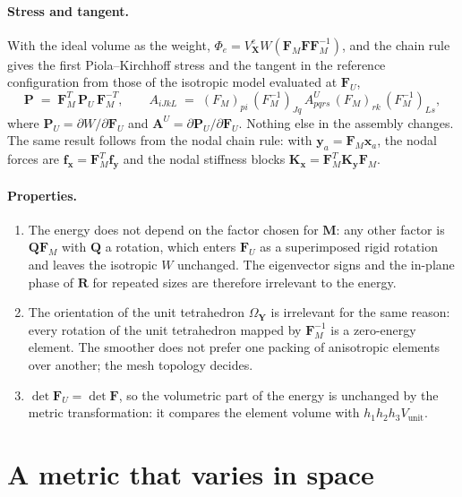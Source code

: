 \documentclass[11pt]{article}
\newcommand{\bs}[1]{\boldsymbol{#1}}
\begin{document}
\paragraph{Stress and tangent.} With the ideal volume as the weight,
$\Phi_e = V^e_{\bs X} W(\bs F_M \bs F \bs F_M^{-1})$, and the chain rule
gives the first Piola--Kirchhoff stress and the tangent in the reference
configuration from those of the isotropic model evaluated at $\bs F_U$,
\begin{equation}
  \bs P \;=\; \bs F_M^T\, \bs P_U\, \bs F_M^{-T},
  \qquad
  A_{iJkL} \;=\; (F_M)_{pi}\,(F_M^{-1})_{Jq}\, A^U_{pqrs}\,
  (F_M)_{rk}\,(F_M^{-1})_{Ls},
  \label{eq:pullback}
\end{equation}
where $\bs P_U = \partial W/\partial \bs F_U$ and
$\bs A^U = \partial \bs P_U / \partial \bs F_U$. Nothing else in the
assembly changes. The same result follows from the nodal chain rule: with
$\bs y_a = \bs F_M \bs x_a$, the nodal forces are
$\bs f_{\bs x} = \bs F_M^T \bs f_{\bs y}$ and the nodal stiffness blocks
$\bs K_{\bs x} = \bs F_M^T \bs K_{\bs y} \bs F_M$.

\paragraph{Properties.}
\begin{enumerate}[itemsep=2pt]
\item The energy does not depend on the factor chosen for $\bs M$: any
  other factor is $\bs Q \bs F_M$ with $\bs Q$ a rotation, which enters
  $\bs F_U$ as a superimposed rigid rotation and leaves the isotropic
  $W$ unchanged. The eigenvector signs and the in-plane phase of $\bs R$
  for repeated sizes are therefore irrelevant to the energy.
\item The orientation of the unit tetrahedron $\Omega_{\bs Y}$ is
  irrelevant for the same reason: every rotation of the unit tetrahedron
  mapped by $\bs F_M^{-1}$ is a zero-energy element. The smoother does not
  prefer one packing of anisotropic elements over another; the mesh
  topology decides.
\item $\det \bs F_U = \det \bs F$, so the volumetric part of the energy
  is unchanged by the metric transformation: it compares the element
  volume with $h_1 h_2 h_3 V_{\mathrm{unit}}$.
\end{enumerate}

\section{A metric that varies in space}
\label{sec:spatial}
\end{document}
